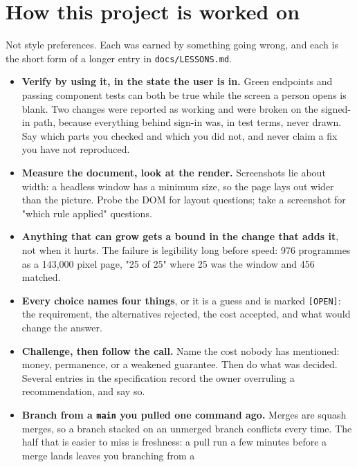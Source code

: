 \documentclass[11pt,a4paper]{article}
\begin{document}
\newpage
\section{How this project is worked on}

Not style preferences. Each was earned by something going wrong, and each is
the short form of a longer entry in \texttt{docs/LESSONS.md}.

\begin{itemize}[leftmargin=*]
  \item \textbf{Verify by using it, in the state the user is in.} Green
        endpoints and passing component tests can both be true while the screen
        a person opens is blank. Two changes were reported as working and were
        broken on the signed-in path, because everything behind sign-in was, in
        test terms, never drawn. Say which parts you checked and which you did
        not, and never claim a fix you have not reproduced.
  \item \textbf{Measure the document, look at the render.} Screenshots lie
        about width: a headless window has a minimum size, so the page lays out
        wider than the picture. Probe the DOM for layout questions; take a
        screenshot for "which rule applied" questions.
  \item \textbf{Anything that can grow gets a bound in the change that adds
        it}, not when it hurts. The failure is legibility long before speed:
        976 programmes as a 143,000 pixel page, "25 of 25" where 25 was the
        window and 456 matched.
  \item \textbf{Every choice names four things}, or it is a guess and is marked
        \texttt{[OPEN]}: the requirement, the alternatives rejected, the cost
        accepted, and what would change the answer.
  \item \textbf{Challenge, then follow the call.} Name the cost nobody has
        mentioned: money, permanence, or a weakened guarantee. Then do what was
        decided. Several entries in the specification record the owner
        overruling a recommendation, and say so.
  \item \textbf{Branch from a \texttt{main} you pulled one command ago.}
        Merges are squash merges, so a branch stacked on an unmerged branch
        conflicts every time. The half that is easier to miss is freshness: a
        pull run a few minutes before a merge lands leaves you branching from a

\end{itemize}
\end{document}
